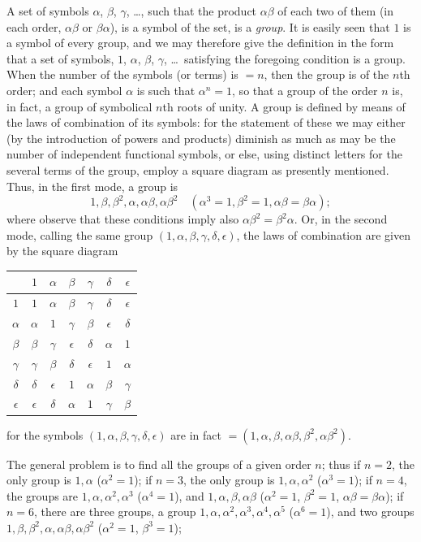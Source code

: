 \documentclass[11pt,a4paper]{book}
\begin{document}
A set of symbols $\alpha$, $\beta$, $\gamma$, \dots, such that the product $\alpha\beta$ of each two of them (in each order, $\alpha\beta$ or $\beta\alpha$), is a symbol of the set, is a \textit{group}. It is easily seen that $1$ is a symbol of every group, and we may therefore give the definition in the form that a set of symbols, $1$, $\alpha$, $\beta$, $\gamma$, \dots\ satisfying the foregoing condition is a group. When the number of the symbols (or terms) is $= n$, then the group is of the $n$th order; and each symbol $\alpha$ is such that $\alpha^n = 1$, so that a group of the order $n$ is, in fact, a group of symbolical $n$th roots of unity. A group is defined by means of the laws of combination of its symbols: for the statement of these we may either (by the introduction of powers and products) diminish as much as may be the number of independent functional symbols, or else, using distinct letters for the several terms of the group, employ a square diagram as presently mentioned. Thus, in the first mode, a group is
\[
1, \beta, \beta^2, \alpha, \alpha\beta, \alpha\beta^2
\quad (\alpha^3 = 1, \beta^2 = 1, \alpha\beta = \beta\alpha);
\]
where observe that these conditions imply also $\alpha\beta^2 = \beta^2\alpha$. Or, in the second mode, calling the same group $(1, \alpha, \beta, \gamma, \delta, \epsilon)$, the laws of combination are given by the square diagram
\begin{center}
\begin{tabular}{c|cccccc}
& $1$ & $\alpha$ & $\beta$ & $\gamma$ & $\delta$ & $\epsilon$ \\
\hline
$1$ & $1$ & $\alpha$ & $\beta$ & $\gamma$ & $\delta$ & $\epsilon$ \\
$\alpha$ & $\alpha$ & $1$ & $\gamma$ & $\beta$ & $\epsilon$ & $\delta$ \\
$\beta$ & $\beta$ & $\gamma$ & $\epsilon$ & $\delta$ & $\alpha$ & $1$ \\
$\gamma$ & $\gamma$ & $\beta$ & $\delta$ & $\epsilon$ & $1$ & $\alpha$ \\
$\delta$ & $\delta$ & $\epsilon$ & $1$ & $\alpha$ & $\beta$ & $\gamma$ \\
$\epsilon$ & $\epsilon$ & $\delta$ & $\alpha$ & $1$ & $\gamma$ & $\beta$
\end{tabular}
\end{center}
for the symbols $(1, \alpha, \beta, \gamma, \delta, \epsilon)$ are in fact $= (1, \alpha, \beta, \alpha\beta, \beta^2, \alpha\beta^2)$.

The general problem is to find all the groups of a given order $n$; thus if $n = 2$, the only group is $1, \alpha$ ($\alpha^2 = 1$); if $n = 3$, the only group is $1, \alpha, \alpha^2$ ($\alpha^3 = 1$); if $n = 4$, the groups are $1, \alpha, \alpha^2, \alpha^3$ ($\alpha^4 = 1$), and $1, \alpha, \beta, \alpha\beta$ ($\alpha^2 = 1$, $\beta^2 = 1$, $\alpha\beta = \beta\alpha$); if $n = 6$, there are three groups, a group $1, \alpha, \alpha^2, \alpha^3, \alpha^4, \alpha^5$ ($\alpha^6 = 1$), and two groups $1, \beta, \beta^2, \alpha, \alpha\beta, \alpha\beta^2$ ($\alpha^2 = 1$, $\beta^3 = 1$);
\end{document}
